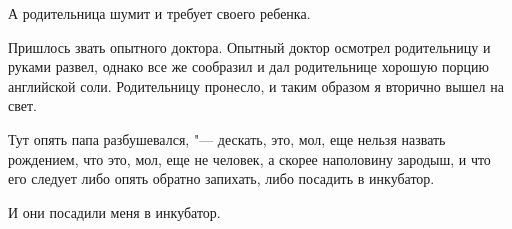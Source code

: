     А  родительница  шумит и  требует своего
ребенка.

    Пришлось  звать опытного  доктора. Опытный доктор осмотрел  родительницу  и  руками
развел, однако все же  сообразил и дал родительнице  хорошую  порцию  английской  соли.
Родительницу  пронесло,  и  таким  образом я
вторично вышел на свет.

    Тут опять папа разбушевался, "---  дескать,
это, мол,  еще нельзя назвать рождением, что
это, мол, еще не человек, а скорее наполовину зародыш,  и  что его следует  либо  опять
обратно запихать, либо посадить в инкубатор.

    И они посадили меня в инкубатор.

